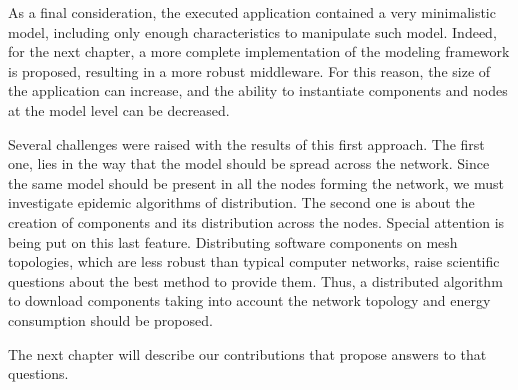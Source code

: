 As a final consideration, the executed application contained a very minimalistic model, including only enough characteristics to manipulate such model.
Indeed, for the next chapter, a more complete implementation of the modeling framework is proposed, resulting in a more robust middleware.
For this reason, the size of the application can increase, and the ability to instantiate components and nodes at the model level can be decreased.

Several challenges were raised with the results of this first approach.
The first one, lies in the way that the model should be spread across the network.
Since the same model should be present in all the nodes forming the network, we must investigate epidemic algorithms of distribution.
The second one is about the creation of components and its distribution across the nodes.
Special attention is being put on this last feature.
Distributing software components on mesh topologies, which are less robust than typical computer networks, raise scientific questions about the best method to provide them.
Thus, a distributed algorithm to download components taking into account the network topology and energy consumption should be proposed.

The next chapter will describe our contributions that propose answers to that questions. 